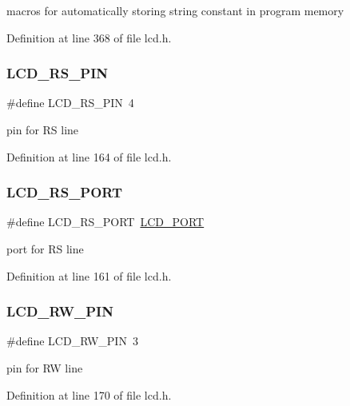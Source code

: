 macros for automatically storing string constant in program memory 



Definition at line 368 of file lcd.\+h.

\mbox{\label{group__pfleury__lcd_gae5c0a0a5750f3aaea06083e3a4a31f5d}} 
\subsubsection{\texorpdfstring{LCD\_RS\_PIN}{LCD\_RS\_PIN}}
{\footnotesize\ttfamily \#define L\+C\+D\+\_\+\+R\+S\+\_\+\+P\+IN~4}

pin for RS line 

Definition at line 164 of file lcd.\+h.

\mbox{\label{group__pfleury__lcd_gac5be2a22727fd9ca349e1c9bcbfbcd47}} 
\subsubsection{\texorpdfstring{LCD\_RS\_PORT}{LCD\_RS\_PORT}}
{\footnotesize\ttfamily \#define L\+C\+D\+\_\+\+R\+S\+\_\+\+P\+O\+RT~\mbox{\hyperlink{group__pfleury__lcd_gabcf42bd88b3c36193f301ca25b033875}{L\+C\+D\+\_\+\+P\+O\+RT}}}

port for RS line 

Definition at line 161 of file lcd.\+h.

\mbox{\label{group__pfleury__lcd_ga3ac938dd5fc02a9a232df6605b5f6aa8}} 
\subsubsection{\texorpdfstring{LCD\_RW\_PIN}{LCD\_RW\_PIN}}
{\footnotesize\ttfamily \#define L\+C\+D\+\_\+\+R\+W\+\_\+\+P\+IN~3}

pin for RW line 

Definition at line 170 of file lcd.\+h.

